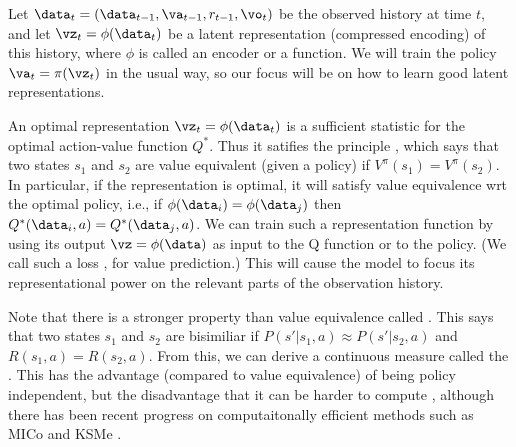 \newcommand{\hist}{\data}

Let $\hist_t =(\hist_{t-1},\va_{t-1},r_{t-1},\vo_t)$ be the observed history at time $t$,
and let $\vz_t = \phi(\hist_t)$ be a latent representation (compressed encoding)
of this history, where $\phi$ is called an encoder or a 
function. We will train the policy $\va_t=\pi(\vz_t)$ in the usual way,
so our focus will be on how to learn good latent representations.

An optimal representation $\vz_t=\phi(\hist_t)$ is a sufficient statistic
for the optimal action-value function $Q^*$.
Thus it satifies the  principle
\citep{Li2006,Castro2011,Grimm2020,Grimm2022,Alver2023,Alver2024},
which says  that two states $s_1$ and $s_2$ are  value equivalent
(given a policy)
if $V^{\pi}(s_1) = V^{\pi}(s_2)$.
In particular, if the representation is optimal,
it will satisfy value equivalence wrt the optimal policy,
i.e.,
if $\phi(\hist_i)=\phi(\hist_j)$ then $Q^*(\hist_i,a)=Q^*(\hist_j,a)$.
We can train such a representation function by using
its output $\vz=\phi(\hist)$ as input to the Q function
or to the policy.
(We call such a loss , for value prediction.)
This will cause the model to focus
its representational power on the relevant parts of the observation
history.


Note that there is a stronger property than value equivalence
called 
\citep{Givan2003}.
This says that two states $s_1$ and $s_2$ are bisimiliar if
$P(s'|s_1,a) \approx P(s'|s_2,a)$ and $R(s_1,a) = R(s_2,a)$.
From this, we can derive a continuous measure called the
 \citep{Ferns2004}.
This has the advantage (compared to value equivalence)
of being policy independent, but the disadvantage that it can be 
harder to compute  \citep{Castro2020mdp,Zhang2021},
although there has been recent progress on computaitonally
efficient methods such as MICo \citep{Castro2021}
and KSMe \citep{Castro2023}.



